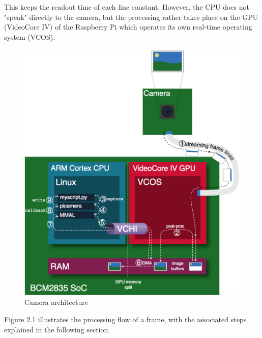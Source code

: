 \documentclass[12pt, a4paper]{report}
\begin{document}
    This keeps the readout time of each line constant. However, the CPU does not "speak" directly to the camera, but the processing rather takes place on the GPU (VideoCore IV) of the Raspberry Pi which operates its own real-time operating system (VCOS).
    
    \bigskip
    \noindent
    \begin{figure}[H]
    \centering
    \includegraphics[scale=0.7]{Images/camera_architecture.png}
    
    \caption{Camera architecture \cite{ReadTheDocsPicamera}}
    \end{figure}
    \bigskip
    
    Figure 2.1 illustrates the processing flow of a frame, with the associated steps explained in the following section.
    
\end{document}
